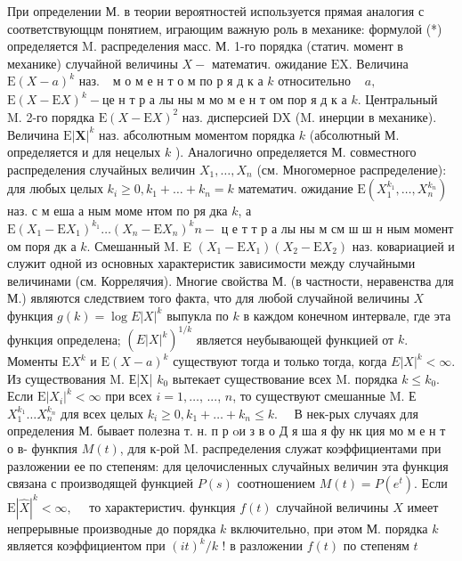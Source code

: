 \documentclass[10pt]{article}
\begin{document}
При определении М. в теории вероятностей используется прямая аналогия с соответствующцм понятием, играющим важную роль в механике: формулой (*) определяется M. распределения масс. М. 1-го порядка (статич. момент в механике) случайной величины $X-$ математич. ожидание $\mathrm{EX}$. Величина $\mathrm{E}(X-a)^{k}$ наз. $\begin{array}{ll}\text { м о м е н т о м по р я д к а } k \text { относительно } & a \text {, }\end{array}$ $\mathrm{E}(X-\mathrm{E} X)^{k}-ц е$ н т р а лы ны м мо м е н т ом пор я д к а $k$. Центральный M. 2-го порядка $\mathrm{E}(X-\mathrm{E} X)^{2}$ наз. дисперсией DX (M. инерции в механике). Величина $\mathrm{E}|\boldsymbol{X}|^{k}$ наз. абсолютным моментом порядка $k$ (абсолютный М. определяется и для нецелых $k$ ). Аналогично определяется М. совместного распределения случайных величин $X_{1}, \ldots, X_{n}$ (см. Многомерное распределение): для любых целых $k_{i} \geqslant 0, k_{1}+\ldots+k_{n}=k$ математич. ожидание $\mathrm{E}\left(X_{1}^{k_{1}}, \ldots, X_{n}^{k_{n}}\right)$ наз. с м еша а ным моме нтом по ря дка $k$, а $\mathrm{E}\left(X_{1}-\mathrm{E} X_{1}\right)^{k_{1}} \ldots\left(X_{n}-\mathrm{E} X_{n}\right)^{k} n-$ ц е т т р а лы ны м см ш ш н ным момент ом поря дк а $k$. Смешанный M. E $\left(X_{1}-\mathrm{E} X_{1}\right)\left(X_{2}-\mathrm{E} X_{2}\right)$ наз. ковариацией и служит одной из основных характеристик зависимости между случайными величинами (см. Коррелячия). Многие свойства М. (в частности, неравенства для М.) являются следствием того факта, что для любой случайной величины $X$ функция $g(k)=\log E|X|^{k}$ выпукла по $k$ в каждом конечном интервале, где эта функция определена; $\left(E|X|^{k}\right)^{1 / k}$ является неубывающей функцией от $k$. Моменты $\mathrm{E} X^{k}$ и $\mathrm{E}(X-a)^{k}$ существуют тогда и только тогда, когда $E|X|^{k}<\infty$. Из существования M. Е|X| $k_{0}$ вытекает существование всех M. порядка $k \leqslant k_{0}$. Если $\mathrm{E}\left|X_{i}\right|^{k}<\infty$ при всех $i=1, \ldots$, ..., $n$, то существуют смешанные M. Е $X_{1}^{k_{1}} \ldots X_{n}^{k_{n}}$ для всех целых $k_{i} \geqslant 0, k_{1}+\ldots+k_{n} \leqslant k . \quad$ В нек-рых случаях для определения М. бывает полезна т. н. п р oи з в о Д я ша я фу нк ция мо м е н т о в- функпия $M(t)$, для к-рой M. распределения служат коэффициентами при разложении ее по степеням: для целочисленных случайных величин эта функция связана с производящей функцией $P(s)$ соотношением $M(t)=P\left(e^{t}\right)$. Если $\mathrm{E}|\hat{X}|^{k}<\infty, \quad$ то характеристич. функция $f(t)$ случайной величины $X$ имеет непрерывные производные до порядка $k$ включительно, при әтом М. порядка $k$ является коэффициентом при $(i t)^{k} / k$ ! в разложении $f(t)$ по степеням $t$
\end{document}
